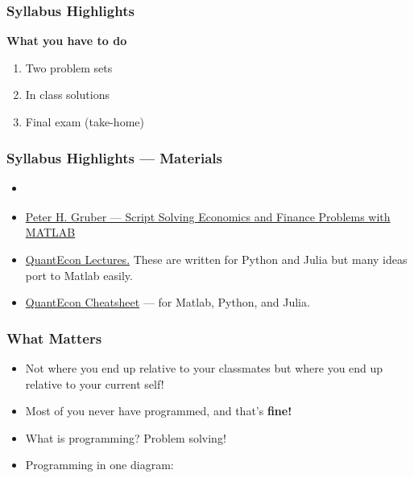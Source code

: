 \documentclass[11pt,xcolor={svgnames},aspectratio=169,usepdftitle=false,notheorems]{beamer}
\begin{document}
\begin{frame}
    \frametitle{Syllabus Highlights}
    \textbf{\alert{What you have to do}}
    \begin{enumerate}
        \item Two problem sets
        \item In class solutions
        \item Final exam (take-home)
    \end{enumerate}
\end{frame}
    
\begin{frame}
  \frametitle{Syllabus Highlights --- Materials}
    \begin{itemize}
      \item \href{https://www.elsevier.com/books/matlab/attaway/978-0-323-91750-6}{}
        \item \href{https://people.lu.usi.ch/gruberp/MatlabMasterScript.pdf}{Peter H. Gruber --- Script Solving Economics and Finance Problems with MATLAB}
        \item \href{https://quantecon.org/lectures/}{QuantEcon Lectures.} These are written for Python and Julia but many ideas port to Matlab easily.
        \item \href{https://cheatsheets.quantecon.org/index.html}{QuantEcon Cheatsheet} ---  for Matlab, Python, and Julia.
    \end{itemize}
\end{frame}

\begin{frame}[c]
  \frametitle{What Matters}
 \begin{itemize}
  \item Not where you end up relative to your classmates but where you end up relative to your current self!
  \item Most of you never have programmed, and that's \alert{\textbf{fine!}} 
  \item What is programming? Problem solving!
  \item Programming in one diagram: 
 \end{itemize} 

 \begin{center}
   
 \end{center}
 
\end{frame}
\end{document}
